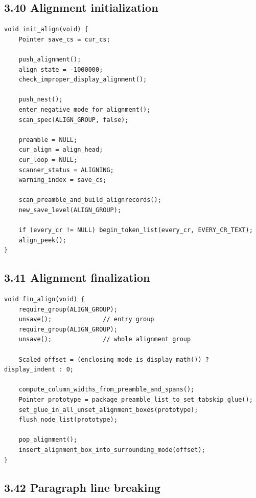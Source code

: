 \documentclass[11pt]{article}
\begin{document}
\subsection{3.40 Alignment
initialization}\label{alignment-initialization}

\begin{verbatim}
void init_align(void) {
    Pointer save_cs = cur_cs;

    push_alignment();
    align_state = -1000000;
    check_improper_display_alignment();

    push_nest();
    enter_negative_mode_for_alignment();
    scan_spec(ALIGN_GROUP, false);

    preamble = NULL;
    cur_align = align_head;
    cur_loop = NULL;
    scanner_status = ALIGNING;
    warning_index = save_cs;

    scan_preamble_and_build_alignrecords();
    new_save_level(ALIGN_GROUP);

    if (every_cr != NULL) begin_token_list(every_cr, EVERY_CR_TEXT);
    align_peek();
}
\end{verbatim}

\subsection{3.41 Alignment finalization}\label{alignment-finalization}

\begin{verbatim}
void fin_align(void) {
    require_group(ALIGN_GROUP);
    unsave();              // entry group
    require_group(ALIGN_GROUP);
    unsave();              // whole alignment group

    Scaled offset = (enclosing_mode_is_display_math()) ? display_indent : 0;

    compute_column_widths_from_preamble_and_spans();
    Pointer prototype = package_preamble_list_to_set_tabskip_glue();
    set_glue_in_all_unset_alignment_boxes(prototype);
    flush_node_list(prototype);

    pop_alignment();
    insert_alignment_box_into_surrounding_mode(offset);
}
\end{verbatim}

\subsection{3.42 Paragraph line breaking}\label{paragraph-line-breaking}
\end{document}
